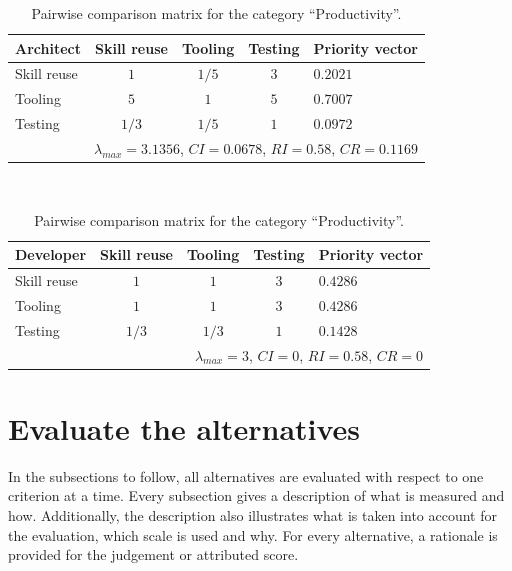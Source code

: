 \begin{table}[h!]
    \centering
    \begin{tabular}{lcccl}
        \hline
        \textbf{Architect} & Skill reuse & Tooling & Testing & Priority vector \\
        \hline
        Skill reuse        & $1$         & $1/5$   & $3$     & $0.2021$        \\
        Tooling            & $5$         & $1$     & $5$     & $0.7007$        \\
        Testing            & $1/3$       & $1/5$   & $1$     & $0.0972$        \\
        \hline
        \multicolumn{5}{r}{$\lambda_{max} = 3.1356$, $CI = 0.0678$, $RI = 0.58$, $CR = 0.1169$}\\
        \hline
    \end{tabular}
    \\\vspace{1em}
    \begin{tabular}{lcccl}
        \hline
        \textbf{Developer} & Skill reuse & Tooling & Testing & Priority vector \\
        \hline
        Skill reuse        & $1$         & $1$     & $3$     & $0.4286$        \\
        Tooling            & $1$         & $1$     & $3$     & $0.4286$        \\
        Testing            & $1/3$       & $1/3$   & $1$     & $0.1428$        \\
        \hline
        \multicolumn{5}{r}{$\lambda_{max} = 3$, $CI = 0$, $RI = 0.58$, $CR = 0$}               \\
        \hline
    \end{tabular}
    \caption{Pairwise comparison matrix for the category ``Productivity''.}
    \label{tab:productivity}
\end{table}

\section{Evaluate the alternatives}
\label{sec:ev:alt}

In the subsections to follow, all alternatives are evaluated with respect to one criterion at a time. Every subsection gives a description of what is measured and how. Additionally, the description also illustrates what is taken into account for the evaluation, which scale is used and why. For every alternative, a rationale is provided for the judgement or attributed score.

